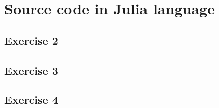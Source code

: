 \documentclass[12pt]{article}
\begin{document}
\appendix
\section{Source code in Julia language}

\subsection*{Exercise 2}


\subsection*{Exercise 3}


\subsection*{Exercise 4}

\end{document}

